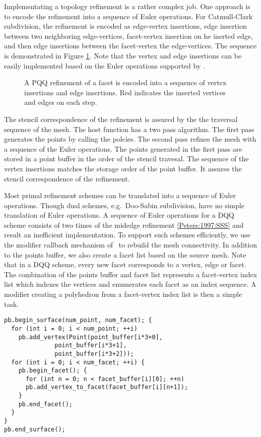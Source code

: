 Implementating a topology refinement is a rather complex job.  One
approach is to encode the refinement into a sequence of Euler
operations. For Catmull-Clark subdivision, the refinement is encoded
as edge-vertex insertions, edge insertion between two neighboring
edge-vertices, facet-vertex insertion on he inerted edge, and then
edge insertions between the facet-vertex the edge-vertices. 
The sequence is demonstrated in Figure \ref{fig:CCRefinement}. 
Note that the vertex and edge insertions can be easily 
implemented based on the Euler operations supported by \cgalpoly.
\begin{figure}
  \centering
  \caption{A PQQ refinement of a facet is encoded into a sequence of
  vertex insertions and edge insertions. Red indicates the inserted
  vertices and edges on each step.}
  \label{fig:CCRefinement}
\end{figure}

The stencil correspondence of the refinement is assured
by the the traversal sequence of the mesh. The host function
has a two pass algorithm. The first pass generates the
points by calling the polcies. The second pass
refines the mesh with a sequence of the Euler operations.
The points generated in the first pass are stored in a
point buffer in the order of the stencil 
travesal. The sequence of the vertex insertions 
matches the storage order of the point buffer. It assures 
the stencil correspondence of the refinement.

Most primal refinement schemes can be translated into a sequence of
Euler operations. Though dual schemes, e.g.\ Doo-Sabin subdivision,
have no simple translation of Euler operations. A sequence
of Euler operations for a DQQ scheme consists of two times 
of the midedge refinement \ref{Peters:1997:SSS} and 
result an inefficient implementation.
To support such schemes efficiently, we use the modifier 
callback mechanism of \cgalpoly\ to rebuild the mesh
connectivity. In addition to the points buffer, we
also create a facet list based on the source mesh. Note that in a DQQ
scheme, every new facet corresponds to a vertex, edge or facet. The
combination of the points buffer and facet list represents a
facet-vertex index list which indexes the vertices and enumerates each
facet as an index sequence. A modifier creating a polyhedron from a
facet-vertex index list is then a simple task.
\begin{lstlisting}
pb.begin_surface(num_point, num_facet); {
  for (int i = 0; i < num_point; ++i) 
    pb.add_vertex(Point(point_buffer[i*3+0], 
	          point_buffer[i*3+1], 
	          point_buffer[i*3+2]));	
  for (int i = 0; i < num_facet; ++i) {
    pb.begin_facet(); {
      for (int n = 0; n < facet_buffer[i][0]; ++n)
      pb.add_vertex_to_facet(facet_buffer[i][n+1]);
    }
    pb.end_facet();
  }
}
pb.end_surface();
\end{lstlisting}

